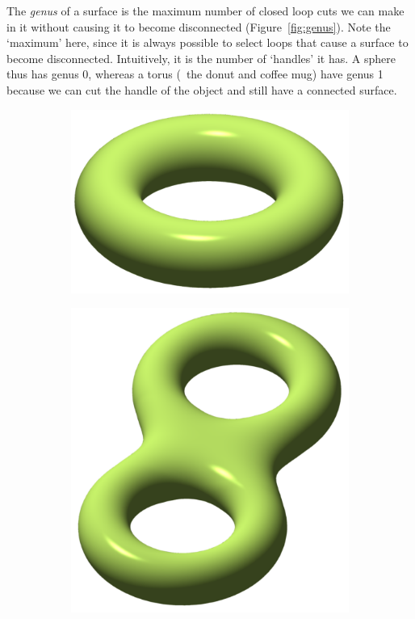 The \emph{genus} of a surface is the maximum number of closed loop cuts we can make in it without causing it to become disconnected (Figure~\ref{fig:genus}).
Note the `maximum' here, since it is always possible to select loops that cause a surface to become disconnected.
Intuitively, it is the number of `handles' it has.
A sphere thus has genus 0, whereas a torus (\eg\ the donut and coffee mug) have genus 1 because we can cut the handle of the object and still have a connected surface.

\begin{figure}
\centering
\begin{subfigure}[b]{0.3\linewidth}
\includegraphics[width=\linewidth]{figs/genus1}
\caption{}%
\label{subfig:genus1}
\end{subfigure}
\quad
\begin{subfigure}[b]{0.3\linewidth}
\includegraphics[width=\linewidth]{figs/genus2}

\end{subfigure}
\end{figure}
